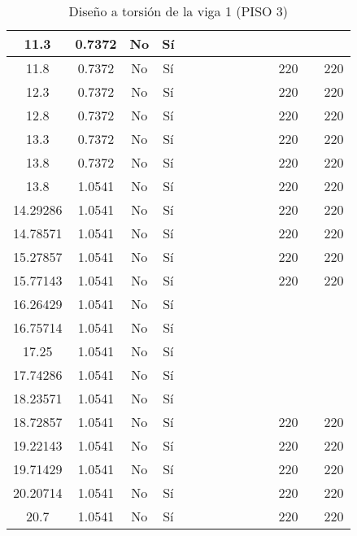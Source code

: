 \begin{table}[H]
{\begin{tabular}{|c|c|c|c|c|c|c|c|c|c|c|c|c|c|}
11.3 & 0.7372 & No  & Sí  &     &     &     &     &     &     &     &     &     &  \bigstrut\\
\hline
11.8 & 0.7372 & No  & Sí  &     &     &     &     &     &     &     & 220 &     & 220 \bigstrut\\
\hline
12.3 & 0.7372 & No  & Sí  &     &     &     &     &     &     &     & 220 &     & 220 \bigstrut\\
\hline
12.8 & 0.7372 & No  & Sí  &     &     &     &     &     &     &     & 220 &     & 220 \bigstrut\\
\hline
13.3 & 0.7372 & No  & Sí  &     &     &     &     &     &     &     & 220 &     & 220 \bigstrut\\
\hline
13.8 & 0.7372 & No  & Sí  &     &     &     &     &     &     &     & 220 &     & 220 \bigstrut\\
\hline
13.8 & 1.0541 & No  & Sí  &     &     &     &     &     &     &     & 220 &     & 220 \bigstrut\\
\hline
14.29286 & 1.0541 & No  & Sí  &     &     &     &     &     &     &     & 220 &     & 220 \bigstrut\\
\hline
14.78571 & 1.0541 & No  & Sí  &     &     &     &     &     &     &     & 220 &     & 220 \bigstrut\\
\hline
15.27857 & 1.0541 & No  & Sí  &     &     &     &     &     &     &     & 220 &     & 220 \bigstrut\\
\hline
15.77143 & 1.0541 & No  & Sí  &     &     &     &     &     &     &     & 220 &     & 220 \bigstrut\\
\hline
16.26429 & 1.0541 & No  & Sí  &     &     &     &     &     &     &     &     &     &  \bigstrut\\
\hline
16.75714 & 1.0541 & No  & Sí  &     &     &     &     &     &     &     &     &     &  \bigstrut\\
\hline
17.25 & 1.0541 & No  & Sí  &     &     &     &     &     &     &     &     &     &  \bigstrut\\
\hline
17.74286 & 1.0541 & No  & Sí  &     &     &     &     &     &     &     &     &     &  \bigstrut\\
\hline
18.23571 & 1.0541 & No  & Sí  &     &     &     &     &     &     &     &     &     &  \bigstrut\\
\hline
18.72857 & 1.0541 & No  & Sí  &     &     &     &     &     &     &     & 220 &     & 220 \bigstrut\\
\hline
19.22143 & 1.0541 & No  & Sí  &     &     &     &     &     &     &     & 220 &     & 220 \bigstrut\\
\hline
19.71429 & 1.0541 & No  & Sí  &     &     &     &     &     &     &     & 220 &     & 220 \bigstrut\\
\hline
20.20714 & 1.0541 & No  & Sí  &     &     &     &     &     &     &     & 220 &     & 220 \bigstrut\\
\hline
20.7 & 1.0541 & No  & Sí  &     &     &     &     &     &     &     & 220 &     & 220 \bigstrut\\
\hline
\end{tabular}%


  }
      \caption{Diseño a torsión de la viga 1 (PISO 3) }
  \label{tab:T VG1 P3 }%
\end{table}%
